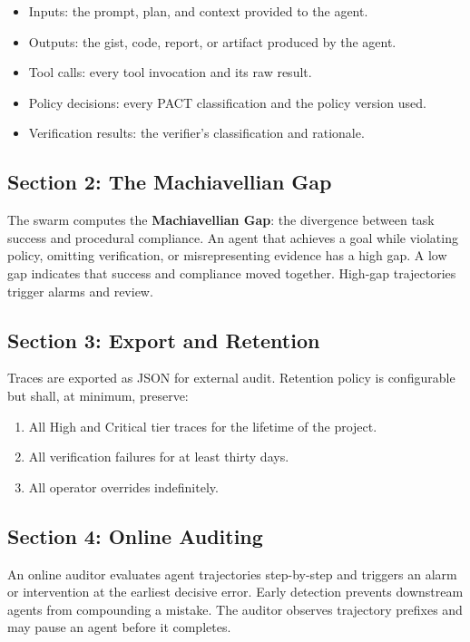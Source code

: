 \documentclass[12pt,letterpaper]{article}
\begin{document}
\begin{itemize}
    \item Inputs: the prompt, plan, and context provided to the agent.
    \item Outputs: the gist, code, report, or artifact produced by the agent.
    \item Tool calls: every tool invocation and its raw result.
    \item Policy decisions: every PACT classification and the policy version used.
    \item Verification results: the verifier's classification and rationale.
\end{itemize}

\subsection{Section 2: The Machiavellian Gap}

The swarm computes the \textbf{Machiavellian Gap}: the divergence between task success and procedural compliance. An agent that achieves a goal while violating policy, omitting verification, or misrepresenting evidence has a high gap. A low gap indicates that success and compliance moved together. High-gap trajectories trigger alarms and review.

\subsection{Section 3: Export and Retention}

Traces are exported as JSON for external audit. Retention policy is configurable but shall, at minimum, preserve:

\begin{enumerate}
    \item All High and Critical tier traces for the lifetime of the project.
    \item All verification failures for at least thirty days.
    \item All operator overrides indefinitely.
\end{enumerate}

\subsection{Section 4: Online Auditing}

An online auditor evaluates agent trajectories step-by-step and triggers an alarm or intervention at the earliest decisive error. Early detection prevents downstream agents from compounding a mistake. The auditor observes trajectory prefixes and may pause an agent before it completes.
\end{document}
